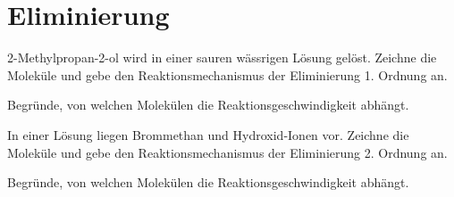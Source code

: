 \section{Eliminierung}
\begin{task}
2-Methylpropan-2-ol wird in einer sauren wässrigen Lösung gelöst. Zeichne die Moleküle und gebe den Reaktionsmechanismus der Eliminierung 1. Ordnung an.

Begründe, von welchen Molekülen die Reaktionsgeschwindigkeit abhängt.
\end{task}
\begin{task}
In einer Lösung liegen Brommethan und Hydroxid-Ionen vor. Zeichne die Moleküle und gebe den Reaktionsmechanismus der Eliminierung 2. Ordnung an.

Begründe, von welchen Molekülen die Reaktionsgeschwindigkeit abhängt.
\end{task}
